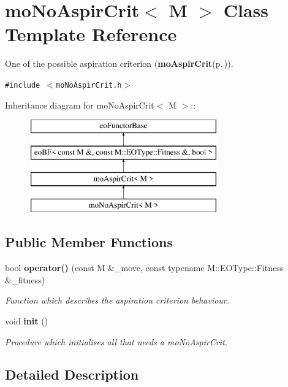 \section{mo\-No\-Aspir\-Crit$<$ M $>$ Class Template Reference}
\label{classmo_no_aspir_crit}
One of the possible aspiration criterion ({\bf mo\-Aspir\-Crit}{\rm (p.\,\pageref{classmo_aspir_crit})}).  


{\tt \#include $<$mo\-No\-Aspir\-Crit.h$>$}

Inheritance diagram for mo\-No\-Aspir\-Crit$<$ M $>$::\begin{figure}[H]
\begin{center}
\leavevmode
\includegraphics[height=4cm]{classmo_no_aspir_crit}
\end{center}
\end{figure}
\subsection*{Public Member Functions}
\begin{CompactItemize}
\item 
bool {\bf operator()} (const M \&\_\-move, const typename M::EOType::Fitness \&\_\-fitness)
\begin{CompactList}\small\item\em Function which describes the aspiration criterion behaviour. \item\end{CompactList}\item 
void {\bf init} ()
\begin{CompactList}\small\item\em Procedure which initialises all that needs a mo\-No\-Aspir\-Crit. \item\end{CompactList}\end{CompactItemize}


\subsection{Detailed Description}

